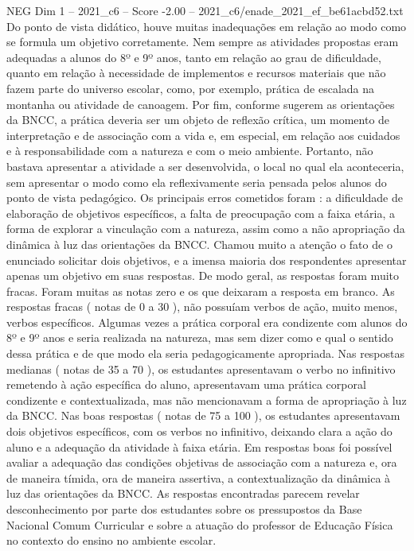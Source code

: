 \begin{textsample}{NEG Dim 1 – 2021\_c6 – Score -2.00 – 2021\_c6/enade\_2021\_ef\_be61acbd52.txt}
Do ponto de vista didático, houve muitas inadequações em relação ao modo como se formula um objetivo corretamente.
Nem sempre as atividades propostas eram adequadas a alunos do 8º e 9º anos, tanto em relação ao grau de dificuldade, quanto em relação à necessidade de implementos e recursos materiais que não fazem parte do universo escolar, como, por exemplo, prática de escalada na montanha ou atividade de canoagem.
Por fim, conforme sugerem as orientações da BNCC, a prática deveria ser um objeto de reflexão crítica, um momento de interpretação e de associação com a vida e, em especial, em relação aos cuidados e à responsabilidade com a natureza e com o meio ambiente.
Portanto, não bastava apresentar a atividade a ser desenvolvida, o local no qual ela aconteceria, sem apresentar o modo como ela reflexivamente seria pensada pelos alunos do ponto de vista pedagógico.
Os principais erros cometidos foram : a dificuldade de elaboração de objetivos específicos, a falta de preocupação com a faixa etária, a forma de explorar a vinculação com a natureza, assim como a não apropriação da dinâmica à luz das orientações da BNCC.
Chamou muito a atenção o fato de o enunciado solicitar dois objetivos, e a imensa maioria dos respondentes apresentar apenas um objetivo em suas respostas.
De modo geral, as respostas foram muito fracas.
Foram muitas as notas zero e os que deixaram a resposta em branco.
As respostas fracas ( notas de 0 a 30 ), não possuíam verbos de ação, muito menos, verbos específicos.
Algumas vezes a prática corporal era condizente com alunos do 8º e 9º anos e seria realizada na natureza, mas sem dizer como e qual o sentido dessa prática e de que modo ela seria pedagogicamente apropriada.
Nas respostas medianas ( notas de 35 a 70 ), os estudantes apresentavam o verbo no infinitivo remetendo à ação específica do aluno, apresentavam uma prática corporal condizente e contextualizada, mas não mencionavam a forma de apropriação à luz da BNCC.
Nas boas respostas ( notas de 75 a 100 ), os estudantes apresentavam dois objetivos específicos, com os verbos no infinitivo, deixando clara a ação do aluno e a adequação da atividade à faixa etária.
Em respostas boas foi possível avaliar a adequação das condições objetivas de associação com a natureza e, ora de maneira tímida, ora de maneira assertiva, a contextualização da dinâmica à luz das orientações da BNCC.
As respostas encontradas parecem revelar desconhecimento por parte dos estudantes sobre os pressupostos da Base Nacional Comum Curricular e sobre a atuação do professor de Educação Física no contexto do ensino no ambiente escolar.

\end{textsample}
